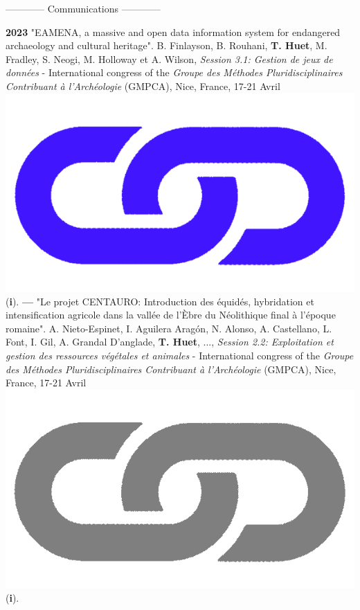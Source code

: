 \documentclass{article}
\begin{document}
\begin{center}------------ Communications ------------\end{center}
\smallbreak
\textbf{2023 }"EAMENA, a massive and open data information system for endangered archaeology and cultural heritage". B. Finlayson, B. Rouhani, \textbf{T. Huet}, M. Fradley, S. Neogi, M. Holloway et A. Wilson, \textit{Session 3.1: Gestion de jeux de données} - International congress of the \textit{Groupe des Méthodes Pluridisciplinaires Contribuant à l'Archéologie} (GMPCA), Nice, France, 17-21 Avril \href{https://eamena-project.github.io/eamena-arches-dev/talks/2023-gmpca/pres/#/title-slide}{\includegraphics[scale=0.02]{link_darkblue.png}} (\textbf{i}).
\smallbreak
\textbf{--- }"Le projet CENTAURO: Introduction des équidés, hybridation et intensification agricole dans la vallée de l'Èbre du Néolithique final à l'époque romaine". A. Nieto-Espinet, I. Aguilera Aragón, N. Alonso, A. Castellano, L. Font, I. Gil, A. Grandal D'anglade, \textbf{T. Huet}, ..., \textit{Session 2.2: Exploitation et gestion des ressources végétales et animales} - International congress of the \textit{Groupe des Méthodes Pluridisciplinaires Contribuant à l'Archéologie} (GMPCA), Nice, France, 17-21 Avril \href{https://gmpca2023.sciencesconf.org/}{\includegraphics[scale=0.02]{link_grey.png}} (\textbf{i}).
\end{document}
